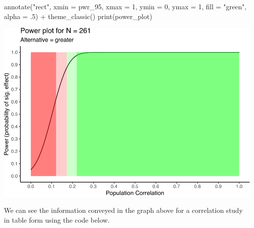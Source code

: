 \documentclass[
]{krantz}
\makeatletter
\newenvironment{Shaded}{\begin{snugshade}}{\end{snugshade}}
\newcommand{\AttributeTok}[1]{\textcolor[rgb]{0.61,0.61,0.61}{#1}}
\newcommand{\DecValTok}[1]{\textcolor[rgb]{0.06,0.06,0.06}{#1}}
\newcommand{\FunctionTok}[1]{\textcolor[rgb]{0,0,0}{#1}}
\newcommand{\NormalTok}[1]{#1}
\newcommand{\SpecialCharTok}[1]{\textcolor[rgb]{0,0,0}{#1}}
\newcommand{\StringTok}[1]{\textcolor[rgb]{0.5,0.5,0.5}{#1}}
\newenvironment{kframe}{%
\medskip{}
\setlength{\fboxsep}{.8em}
 \def\at@end@of@kframe{}%
 \ifinner\ifhmode%
  \def\at@end@of@kframe{\end{minipage}}%
  \begin{minipage}{\columnwidth}%
 \fi\fi%
 \def\FrameCommand##1{\hskip\@totalleftmargin \hskip-\fboxsep
 \colorbox{shadecolor}{##1}\hskip-\fboxsep
     \hskip-\linewidth \hskip-\@totalleftmargin \hskip\columnwidth}%
 \MakeFramed {\advance\hsize-\width
   \@totalleftmargin\z@ \linewidth\hsize
   \@setminipage}}%
 {\par\unskip\endMakeFramed%
 \at@end@of@kframe}
\renewenvironment{Shaded}{\begin{kframe}}{\end{kframe}}
\makeatother
\begin{document}
\begin{Shaded}
\begin{Highlighting}[]
  \FunctionTok{annotate}\NormalTok{(}\StringTok{"rect"}\NormalTok{, }\AttributeTok{xmin =}\NormalTok{ pwr\_95, }\AttributeTok{xmax =} \DecValTok{1}\NormalTok{, }\AttributeTok{ymin =} \DecValTok{0}\NormalTok{, }\AttributeTok{ymax =} \DecValTok{1}\NormalTok{, }\AttributeTok{fill =} \StringTok{"green"}\NormalTok{, }\AttributeTok{alpha =}\NormalTok{ .}\DecValTok{5}\NormalTok{) }\SpecialCharTok{+}
  \FunctionTok{theme\_classic}\NormalTok{()}
\FunctionTok{print}\NormalTok{(power\_plot)}
\end{Highlighting}
\end{Shaded}

\includegraphics{bookdown_files/figure-latex/unnamed-chunk-364-1.pdf}

We can see the information conveyed in the graph above for a correlation study in table form using the code below.
\end{document}
